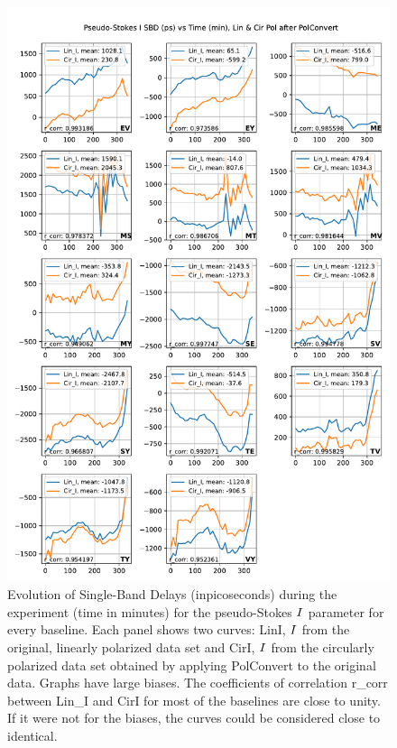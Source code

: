 \documentclass[letterpaper,twoside,12pt]{article}
\begin{document}
\begin{figure}[ht!]
  \begin{center}
  \includegraphics[width=33pc]{SBD_Lin_I_and_Cir_I.pdf}
  \caption{\small Evolution of Single-Band Delays (inpicoseconds) during the experiment (time in minutes) for the pseudo-Stokes $\protect I$ parameter for every baseline. Each panel shows two curves: LinI, $\protect I$ from the original, linearly polarized data set and CirI, $\protect I$ from the circularly polarized data set obtained by applying PolConvert to the original data. Graphs have large biases. The coefficients of correlation r\_corr between Lin\_I and CirI for most of the baselines are close to unity. If it were not for the biases, the curves could be considered close to identical.}
  \label{sbd_lin_and_cir}
  \end{center}
\end{figure}
\end{document}

